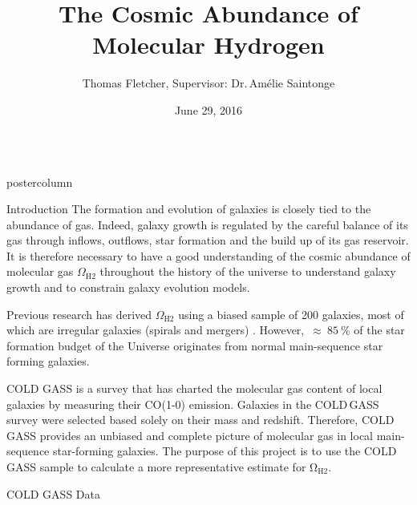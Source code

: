 \documentclass{beamer}
\title{\huge The Cosmic Abundance of Molecular Hydrogen}
\author{Thomas Fletcher, Supervisor: Dr.\,Amélie Saintonge}
\institute{Department of Physics and Astronomy, University College London}
\date{June 29, 2016}
\newlength{\columnheight}
\begin{document}
\begin{frame}
\begin{columns}
	\begin{column}{.5\textwidth}
		\begin{beamercolorbox}[center,wd=\textwidth]{postercolumn}
			\begin{minipage}[T]{.95\textwidth}  %
				\parbox[t][\columnheight]{\textwidth}{ %
					\begin{myblock}{\LARGE Introduction}
            The formation and evolution of galaxies is closely tied to the
            abundance of gas. Indeed, galaxy growth is regulated by the careful balance
            of its gas through inflows, outflows, star formation and the build
            up of its gas reservoir. It is therefore necessary to have a good
            understanding of the cosmic abundance of molecular gas
            $\Omega_{\text{H2}}$ throughout the history of the
            universe to understand galaxy growth and to constrain galaxy
            evolution models. \vspace{1ex}

            Previous research has derived $\Omega_{\text{H2}}$ using a biased sample of
            200 galaxies, most of which are irregular galaxies (spirals and
            mergers) \cite{keres2003co}. However,~$\approx~85~\%$ of the star
            formation budget of the Universe originates from normal
            main-sequence star forming galaxies. \vspace{1ex}

            COLD GASS is a survey that has charted the molecular gas content of
            local galaxies by measuring their CO(1-0) emission. Galaxies in
            the {COLD\,GASS} survey were selected based solely on their
            mass and redshift. Therefore, COLD GASS provides an unbiased and
            complete picture of molecular gas in local main-sequence
            star-forming galaxies. The purpose of this project is
            to use the COLD GASS sample to calculate a more representative
            estimate for $\mathrm{\Omega_{H2}}$.
					\end{myblock}\vfill
					\begin{myblock}{\LARGE COLD GASS Data}


\end{myblock}}
\end{minipage}
\end{beamercolorbox}
\end{column}
\end{columns}
\end{frame}
\end{document}
